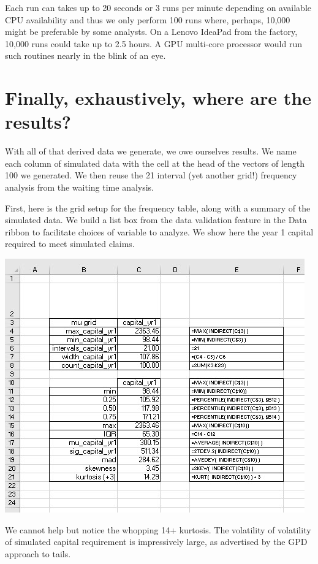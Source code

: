 \documentclass[
]{book}
\begin{document}
Each run can takes up to 20 seconds or 3 runs per minute depending on available CPU availability and thus we only perform 100 runs where, perhaps, 10,000 might be preferable by some analysts. On a Lenovo IdeaPad from the factory, 10,000 runs could take up to 2.5 hours. A GPU multi-core processor would run such routines nearly in the blink of an eye.

\hypertarget{finally-exhaustively-where-are-the-results}{%
\section{Finally, exhaustively, where are the results?}\label{finally-exhaustively-where-are-the-results}}

With all of that derived data we generate, we owe ourselves results. We name each column of simulated data with the cell at the head of the vectors of length 100 we generated. We then reuse the 21 interval (yet another grid!) frequency analysis from the waiting time analysis.

First, here is the grid setup for the frequency table, along with a summary of the simulated data. We build a list box from the data validation feature in the Data ribbon to facilitate choices of variable to analyze. We show here the year 1 capital required to meet simulated claims.

\includegraphics{images/06/claims-eda-sim-grid-summary.jpg}

We cannot help but notice the whopping 14+ kurtosis. The volatility of volatility of simulated capital requirement is impressively large, as advertised by the GPD approach to tails.
\end{document}
